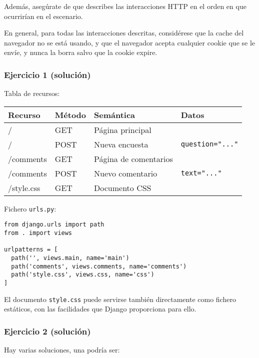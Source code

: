   Además, asegúrate de que describes las interacciones HTTP en el orden en que ocurrirían en el escenario.

  En general, para todas las interacciones descritas, considérese que la cache del navegador no se está usando, y que el navegador acepta cualquier cookie que se le envíe, y nunca la borra salvo que la cookie expire.


\subsubsection{Ejercicio 1  (solución)}

Tabla de recursos:
\vspace{.4cm}

\begin{tabular}{|l|l|l|l|}
  \hline
  Recurso & Método & Semántica & Datos \\ \hline\hline
  /       & GET    & Página principal & \\
  /       & POST   & Nueva encuesta & \texttt{question="..."} \\
  /comments & GET & Página de comentarios & \\
  /comments & POST & Nuevo comentario & \texttt{text="..."} \\
  /style.css & GET & Documento CSS &  \\
  \hline
\end{tabular}

\vspace{.4cm}
Fichero \texttt{urls.py}:

\begin{verbatim}
from django.urls import path
from . import views

urlpatterns = [
  path('', views.main, name='main')
  path('comments', views.comments, name='comments')
  path('style.css', views.css, name='css')
]
\end{verbatim}

El documento \texttt{style.css} puede servirse también directamente como fichero estáticos, con las facilidades que Django proporciona para ello.


\subsubsection{Ejercicio 2 (solución)}

Hay varias soluciones, una podría ser:

